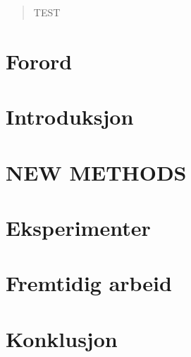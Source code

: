 \documentclass[12pt,twoside,onecolumn]{article}
\begin{document}
\newpage
\vspace*{\fill}
\begin{abstract}
TEST
\end{abstract}
\vspace*{\fill}
\newpage

\tableofcontents
\newpage

\section{Forord}
\newpage

\section{Introduksjon}




\newpage

\section{NEW METHODS}
\newpage

\section{Eksperimenter}
\newpage

\section{Fremtidig arbeid}
\newpage

\section{Konklusjon}
\newpage





\end{document}

